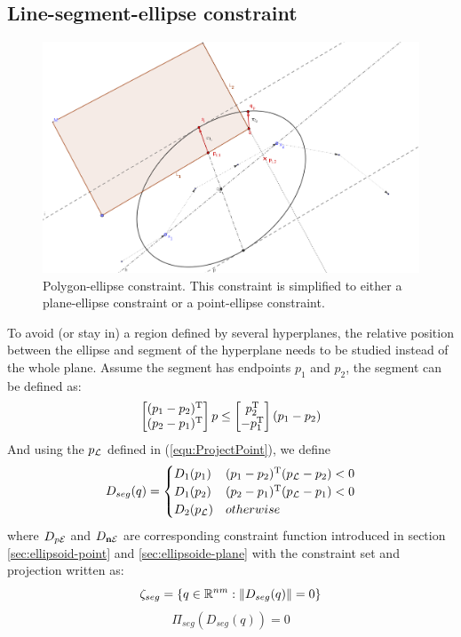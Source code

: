 \documentclass[journal]{IEEEtran}  %
\begin{document}
\subsection{Line-segment-ellipse constraint}\label{chapter:ellipse to segment}

\begin{figure}[htbp]
\begin{center}
\includegraphics[width=0.6\linewidth]{Ellipse2safezone_V2}
\caption{Polygon-ellipse constraint. This constraint is simplified to either a plane-ellipse constraint or a point-ellipse constraint.}
\label{fig:Ellipse-to-safezone}
\end{center}
\end{figure}

To avoid (or stay in) a region defined by several hyperplanes, the relative position between the ellipse and segment of the hyperplane needs to be studied instead of the whole plane. Assume the segment has endpoints $p_1$ and $p_2$, the segment can be defined as:
\begin{equation}
\begin{bmatrix}(p_1-p_2)^\mathrm{T}\\(p_2-p_1)^\mathrm{T}\end{bmatrix} p \leq \begin{bmatrix}p_2^\mathrm{T}\\-p_1^\mathrm{T}\end{bmatrix}(p_1-p_2)
\end{equation}
And using the $p_{\mathcal{L}}$ defined in (\ref{equ:ProjectPoint}), we define
\begin{equation}
D_{seg}(q) = \begin{cases}
D_1(p_1) & (p_1-p_2)^\mathrm{T} (p_{\mathcal{L}}-p_2)<0\\
D_1(p_2) & (p_2-p_1)^\mathrm{T} (p_{\mathcal{L}}-p_1)<0\\
D_2(p_{\mathcal{L}}) & otherwise
\end{cases}
\end{equation}
where $D_{p\mathcal{E}}$ and $D_{\mathbf{n}\mathcal{E}}$ are corresponding constraint function introduced in section \ref{sec:ellipsoid-point} and \ref{sec:ellipsoide-plane}
with the constraint set and projection written as:
\begin{equation}
\zeta_{seg} = \{q\in\mathbb{R}^{nm}:\lVert D_{seg}(q)\rVert = 0 \}
\end{equation}
\begin{equation}
\Pi_{seg}(D_{seg}(q)) = {0}
\end{equation}
\end{document}
